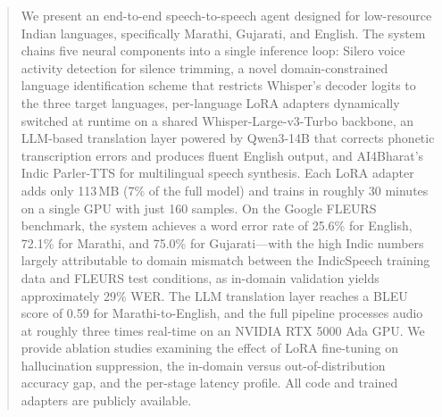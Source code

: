 
\begin{abstract}
We present an end-to-end speech-to-speech agent designed for low-resource Indian languages, specifically Marathi, Gujarati, and English. The system chains five neural components into a single inference loop: Silero voice activity detection for silence trimming, a novel domain-constrained language identification scheme that restricts Whisper's decoder logits to the three target languages, per-language LoRA adapters dynamically switched at runtime on a shared Whisper-Large-v3-Turbo backbone, an LLM-based translation layer powered by Qwen3-14B that corrects phonetic transcription errors and produces fluent English output, and AI4Bharat's Indic Parler-TTS for multilingual speech synthesis. Each LoRA adapter adds only 113\,MB (7\% of the full model) and trains in roughly 30 minutes on a single GPU with just 160 samples. On the Google FLEURS benchmark, the system achieves a word error rate of 25.6\% for English, 72.1\% for Marathi, and 75.0\% for Gujarati---with the high Indic numbers largely attributable to domain mismatch between the IndicSpeech training data and FLEURS test conditions, as in-domain validation yields approximately 29\% WER. The LLM translation layer reaches a BLEU score of 0.59 for Marathi-to-English, and the full pipeline processes audio at roughly three times real-time on an NVIDIA RTX 5000 Ada GPU. We provide ablation studies examining the effect of LoRA fine-tuning on hallucination suppression, the in-domain versus out-of-distribution accuracy gap, and the per-stage latency profile. All code and trained adapters are publicly available.
\end{abstract}
